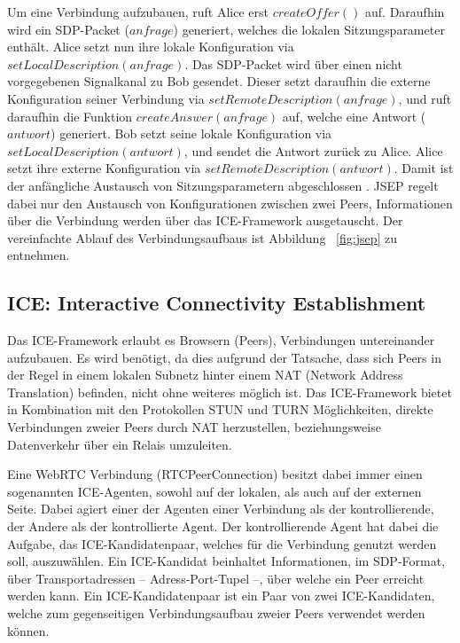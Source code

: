Um eine Verbindung aufzubauen, ruft Alice erst $createOffer()$ auf. Daraufhin wird ein SDP-Packet ($anfrage$) generiert, welches die lokalen Sitzungsparameter enthält. Alice setzt nun ihre lokale Konfiguration via $setLocalDescription(anfrage)$. Das \acs{SDP}-Packet wird über einen nicht vorgegebenen Signalkanal zu Bob gesendet. Dieser setzt daraufhin die externe Konfiguration seiner Verbindung via $setRemoteDescription(anfrage)$, und ruft daraufhin die Funktion $createAnswer(anfrage)$ auf, welche eine Antwort ($antwort$) generiert. Bob setzt seine lokale Konfiguration via $setLocalDescription(antwort)$, und sendet die Antwort zurück zu Alice. Alice setzt ihre externe Konfiguration via $setRemoteDescription(antwort)$. Damit ist der anfängliche Austausch von Sitzungsparametern abgeschlossen \cite{altanai2014}. \acs{JSEP} regelt dabei nur den Austausch von Konfigurationen zwischen zwei Peers, Informationen über die Verbindung werden über das \acs{ICE}-Framework ausgetauscht. Der vereinfachte Ablauf des Verbindungsaufbaus ist Abbildung ~\ref{fig:jsep} zu entnehmen.

\subsection{ICE: Interactive Connectivity Establishment}
Das \acf{ICE}-Framework erlaubt es Browsern (Peers), Verbindungen untereinander aufzubauen. Es wird benötigt, da dies aufgrund der Tatsache, dass sich Peers in der Regel in einem lokalen Subnetz hinter einem \acs{NAT} (Network Address Translation) befinden, nicht ohne weiteres möglich ist. Das \acs{ICE}-Framework bietet in Kombination mit den Protokollen \acs{STUN} und \acs{TURN} Möglichkeiten, direkte Verbindungen zweier Peers durch \acs{NAT} herzustellen, beziehungsweise Datenverkehr über ein Relais umzuleiten.\par

Eine \acs{WebRTC} Verbindung (RTCPeerConnection) besitzt dabei immer einen sogenannten \acs{ICE}-Agenten, sowohl auf der lokalen, als auch auf der externen Seite. Dabei agiert einer der Agenten einer Verbindung als der kontrollierende, der Andere als der kontrollierte Agent. Der kontrollierende Agent hat dabei die Aufgabe, das \acs{ICE}-Kandidatenpaar, welches für die Verbindung genutzt werden soll, auszuwählen. Ein \acs{ICE}-Kandidat beinhaltet Informationen, im \acs{SDP}-Format, über Transportadressen -- Adress-Port-Tupel --, über welche ein Peer erreicht werden kann. Ein \acs{ICE}-Kandidatenpaar ist ein Paar von zwei \acs{ICE}-Kandidaten, welche zum gegenseitigen Verbindungsaufbau zweier Peers verwendet werden können.

